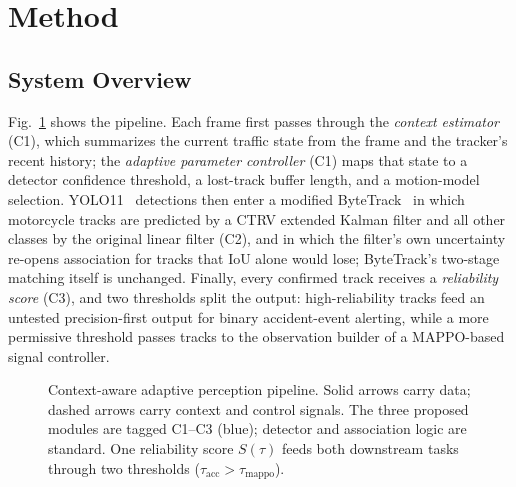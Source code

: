 
\section{Method}
\label{sec:method}

\subsection{System Overview}
\label{subsec:overview}

Fig.~\ref{fig:pipeline} shows the pipeline.
Each frame first passes through the \emph{context estimator} (C1),
which summarizes the current traffic state from the frame and the
tracker's recent history; the \emph{adaptive parameter controller} (C1)
maps that state to a detector confidence threshold, a lost-track buffer
length, and a motion-model selection.
YOLO11~\cite{Khanam2024_yolo11} detections then enter a modified
ByteTrack~\cite{Zhang2022_bytetrack} in which motorcycle tracks are
predicted by a CTRV extended Kalman filter and all other classes by the
original linear filter (C2), and in which the filter's own uncertainty
re-opens association for tracks that IoU alone would lose; ByteTrack's
two-stage matching itself is unchanged.
Finally, every confirmed track receives a \emph{reliability score}
(C3), and two thresholds split the output: high-reliability tracks feed
an untested precision-first output for binary accident-event alerting,
while a more permissive threshold passes tracks to the observation
builder of a MAPPO-based~\cite{Yu2022_mappo} signal controller.

\begin{figure}[t]
  \centering
  \resizebox{0.96\linewidth}{!}{}
  \caption{Context-aware adaptive perception pipeline.
           Solid arrows carry data; dashed arrows carry context and
           control signals.
           The three proposed modules are tagged C1--C3 (blue);
           detector and association logic are standard.
           One reliability score $S(\tau)$ feeds both downstream tasks
           through two thresholds
           ($\tau_{\mathrm{acc}} > \tau_{\mathrm{mappo}}$).}
  \label{fig:pipeline}
\end{figure}

